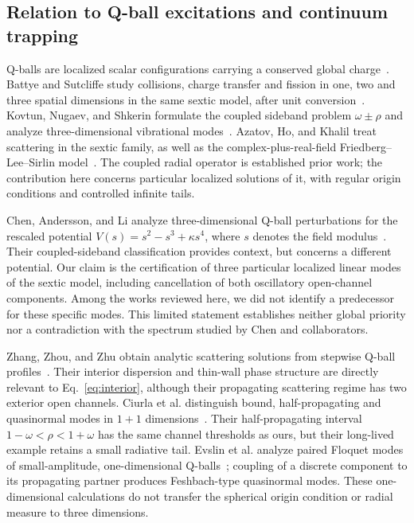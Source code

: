 \subsection{Relation to Q-ball excitations and continuum trapping}
\label{sec:related-work}

Q-balls are localized scalar configurations carrying a conserved global
charge~\cite{Coleman1985}. Battye and Sutcliffe study collisions, charge
transfer and fission in one, two and three spatial dimensions in the same
sextic model, after unit conversion~\cite{BattyeSutcliffe2000}.
Kovtun, Nugaev, and Shkerin formulate the coupled sideband problem
$\omega\pm\rho$ and analyze three-dimensional vibrational
modes~\cite{Kovtun2018}. Azatov, Ho, and Khalil treat scattering in the
sextic family, as well as the complex-plus-real-field
Friedberg--Lee--Sirlin model~\cite{Azatov2024,FriedbergLeeSirlin1976}.
The coupled radial operator is established prior work; the contribution
here concerns particular localized solutions of it, with regular origin
conditions and controlled infinite tails.

Chen, Andersson, and Li analyze three-dimensional Q-ball perturbations
for the rescaled potential $V(s)=s^2-s^3+\kappa s^4$, where $s$ denotes
the field modulus~\cite{ChenAnderssonLi2025}. Their coupled-sideband
classification provides context, but concerns a different potential.
Our claim is the certification of three particular localized linear
modes of the sextic model, including cancellation of both oscillatory
open-channel components. Among the works reviewed here, we did not
identify a predecessor for these specific modes. This limited
statement establishes neither global priority nor a contradiction with
the spectrum studied by Chen and collaborators.

Zhang, Zhou, and Zhu obtain analytic scattering solutions from stepwise
Q-ball profiles~\cite{ZhangZhouZhu2025}. Their interior dispersion and
thin-wall phase structure are directly relevant to Eq.~\eqref{eq:interior},
although their propagating scattering regime has two exterior open
channels. Ciurla et al. distinguish bound, half-propagating and quasinormal
modes in $1+1$ dimensions~\cite{Ciurla2024}. Their half-propagating interval
$1-\omega<\rho<1+\omega$ has the same channel thresholds as ours, but their
long-lived example retains a small radiative tail. Evslin et al. analyze
paired Floquet modes of small-amplitude, one-dimensional
Q-balls~\cite{Evslin2026}; coupling of a discrete component to its
propagating partner produces Feshbach-type quasinormal modes. These
one-dimensional calculations do not transfer the spherical origin
condition or radial measure to three dimensions.

